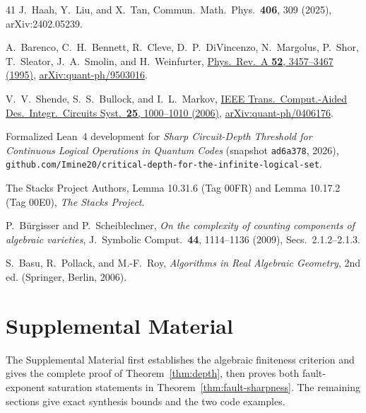 \documentclass[aps,prl,reprint,notitlepage,nofootinbib,nobibnotes]{revtex4-2}
\newcommand{\onecolumngrid}{\onecolumn}
\begin{document}
\begin{thebibliography}{41}
J.~Haah, Y.~Liu, and X.~Tan,
Commun.\ Math.\ Phys.\ \textbf{406}, 309 (2025),
arXiv:2402.05239.

A.~Barenco, C.~H.~Bennett, R.~Cleve, D.~P.~DiVincenzo,
N.~Margolus, P.~Shor, T.~Sleator, J.~A.~Smolin, and H.~Weinfurter,
\href{https://doi.org/10.1103/PhysRevA.52.3457}{Phys.\ Rev.\ A \textbf{52}, 3457--3467 (1995)},
\href{https://arxiv.org/abs/quant-ph/9503016}{arXiv:quant-ph/9503016}.

V.~V.~Shende, S.~S.~Bullock, and I.~L.~Markov,
\href{https://doi.org/10.1109/TCAD.2005.855930}{IEEE Trans.\ Comput.-Aided Des.\ Integr.\ Circuits Syst.\ \textbf{25}, 1000--1010 (2006)},
\href{https://arxiv.org/abs/quant-ph/0406176}{arXiv:quant-ph/0406176}.

Formalized Lean~4 development for \emph{Sharp Circuit-Depth Threshold for Continuous Logical Operations in Quantum Codes} (snapshot \texttt{ad6a378}, 2026),
\nolinkurl{github.com/Imine20/critical-depth-for-the-infinite-logical-set}.

The Stacks Project Authors,
Lemma 10.31.6 (Tag 00FR) and Lemma 10.17.2 (Tag 00E0),
\emph{The Stacks Project}.

P.~B\"urgisser and P.~Scheiblechner,
\emph{On the complexity of counting components of algebraic varieties},
J.~Symbolic Comput.\ \textbf{44}, 1114--1136 (2009), Secs.~2.1.2--2.1.3.

S.~Basu, R.~Pollack, and M.-F.~Roy,
\emph{Algorithms in Real Algebraic Geometry},
2nd ed. (Springer, Berlin, 2006).

\end{thebibliography}

\onecolumngrid
\clearpage
\setcounter{equation}{0}
\renewcommand{\theequation}{S\arabic{equation}}
\renewcommand{\theHequation}{S\arabic{equation}}
\setcounter{lemma}{0}
\renewcommand{\thelemma}{S\arabic{lemma}}
\setcounter{proposition}{0}
\renewcommand{\theproposition}{S\arabic{proposition}}
\section*{Supplemental Material}
The Supplemental Material first establishes the algebraic finiteness criterion and gives the complete proof of Theorem~\ref{thm:depth}, then proves both fault-exponent saturation statements in Theorem~\ref{thm:fault-sharpness}. The remaining sections give exact synthesis bounds and the two code examples.
\end{document}
